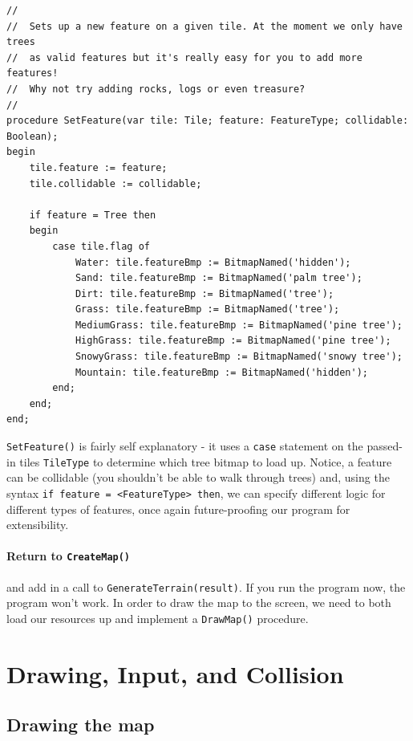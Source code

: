 \documentclass{article}
\begin{document}
\begin{verbatim}
//
//	Sets up a new feature on a given tile. At the moment we only have trees
//	as valid features but it's really easy for you to add more features! 
//	Why not try adding rocks, logs or even treasure?
//
procedure SetFeature(var tile: Tile; feature: FeatureType; collidable: Boolean);
begin
	tile.feature := feature;
	tile.collidable := collidable;

	if feature = Tree then
	begin
		case tile.flag of
			Water: tile.featureBmp := BitmapNamed('hidden');
			Sand: tile.featureBmp := BitmapNamed('palm tree');
			Dirt: tile.featureBmp := BitmapNamed('tree');
			Grass: tile.featureBmp := BitmapNamed('tree');
			MediumGrass: tile.featureBmp := BitmapNamed('pine tree');
			HighGrass: tile.featureBmp := BitmapNamed('pine tree');
			SnowyGrass: tile.featureBmp := BitmapNamed('snowy tree');
			Mountain: tile.featureBmp := BitmapNamed('hidden');
		end;
	end;
end;
\end{verbatim}

\texttt{SetFeature()} is fairly self explanatory - it uses a \texttt{case} statement on the passed-in tiles \texttt{TileType} to determine which tree bitmap to load up. Notice, a feature can be collidable (you shouldn't be able to walk through trees) and, using the syntax \texttt{if feature = <FeatureType> then}, we can specify different logic for different types of features, once again future-proofing our program for extensibility.

\paragraph{Return to \texttt{CreateMap()}} and add in a call to \texttt{GenerateTerrain(result)}. If you run the program now, the program won't work. In order to draw the map to the screen, we need to both load our resources up and implement a \texttt{DrawMap()} procedure.

\section{Drawing, Input, and Collision}

\subsection{Drawing the map}
\end{document}
